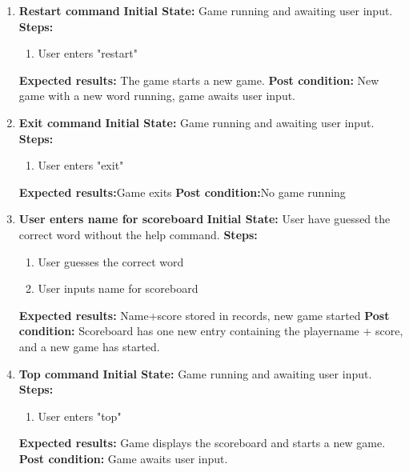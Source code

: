 \documentclass{article}
\begin{document}
\begin{enumerate}
	\item \textbf{Restart command}\newline
	\textbf{Initial State:} Game running and awaiting user input.\newline
	\textbf{Steps:}
	\begin{enumerate}
	\item User enters "restart"
	\end{enumerate}
	\textbf{Expected results:} The game starts a new game.\newline
	\textbf{Post condition:} New game with a new word running, game awaits user input.\newline

	\item \textbf{Exit command}\newline
	\textbf{Initial State:} Game running and awaiting user input.\newline
	\textbf{Steps:}
	\begin{enumerate}
	\item User enters "exit"
	\end{enumerate}
	\textbf{Expected results:}Game exits\newline
	\textbf{Post condition:}No game running\newline

	\item \textbf{User enters name for scoreboard}\newline
	\textbf{Initial State:} User have guessed the correct word without the help command.\newline
	\textbf{Steps:}
	\begin{enumerate}
	\item User guesses the correct word
	\item User inputs name for scoreboard
	\end{enumerate}
	\textbf{Expected results:} Name+score stored in records, new game started\newline
	\textbf{Post condition:} Scoreboard has one new entry containing the playername + score, and a new game has started.\newline

	\item \textbf{Top command}\newline
	\textbf{Initial State:} Game running and awaiting user input.\newline
	\textbf{Steps:}
	\begin{enumerate}
	\item User enters "top"
	\end{enumerate}
	\textbf{Expected results:} Game displays the scoreboard and starts a new game.\newline
	\textbf{Post condition:} Game awaits user input.\newline
	\end{enumerate}
\end{document}
